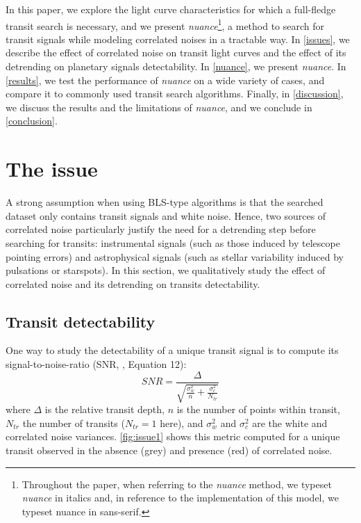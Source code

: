 \documentclass{aastex631}
\newcommand{\nuancemethod}{\textit{nuance}}
\newcommand{\nuance}{\nuancemethod{}}
\newcommand{\nuancecode}{\textsf{nuance}}
\begin{document}
In this paper, we explore the light curve characteristics for which a full-fledge transit search is necessary, and we present \nuancemethod{}\footnote{Throughout the paper, when referring to the \nuancemethod{} method, we typeset \nuancemethod{} in italics and, in reference to the implementation of this model, we typeset \nuancecode{} in sans-serif.}, a method to search for transit signals while modeling correlated noises in a tractable way. In \autoref{issues}, we describe the effect of correlated noise on transit light curves and the effect of its detrending on planetary signals detectability. In \autoref{nuance}, we present \nuance{}. In \autoref{results}, we test the performance of \nuance{} on a wide variety of cases, and compare it to commonly used transit search algorithms. Finally, in \autoref{discussion}, we discuss the results and the limitations of \nuance{}, and we conclude in \autoref{conclusion}.

\newpage
\section{The issue}\label{issues}

A strong assumption when using BLS-type algorithms is that the searched dataset only contains transit signals and white noise. Hence, two sources of correlated noise particularly justify the need for a detrending step before searching for transits: instrumental signals (such as those induced by telescope pointing errors) and astrophysical signals (such as stellar variability induced by pulsations or starspots). In this section, we qualitatively study the effect of correlated noise and its detrending on transits detectability.

\subsection{Transit detectability}

One way to study the detectability of a unique transit signal is to compute its signal-to-noise-ratio (SNR, \citealt{Pont2006}, Equation 12):
\begin{equation}\label{eq:snr}
  SNR= \frac{\Delta}{\sqrt{\frac{\sigma_w^2}{n} + \frac{\sigma_c^2}{N_{tr}}}}
\end{equation}
where $\Delta$ is the relative transit depth, $n$ is the number of points within transit, $N_{tr}$ the number of transits ($N_{tr}=1$ here), and $\sigma_w^2$ and $\sigma_c^2$ are the white and correlated noise variances. \autoref{fig:issue1} shows this metric computed for a unique transit observed in the absence (grey) and presence (red) of correlated noise.
\end{document}
